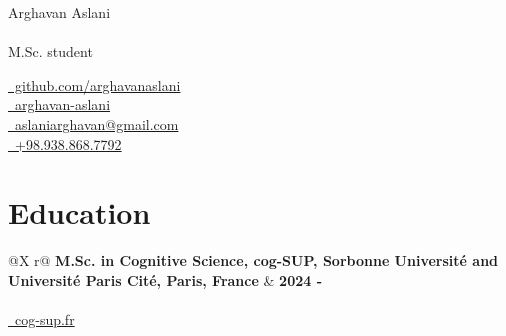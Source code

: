 \documentclass[a4paper,10pt]{article}
\begin{document}
\pagestyle{empty} 


\begin{minipage}[c]{2.5cm}
\end{minipage}%
\hspace{0em} %
\begin{minipage}[c]{\dimexpr\linewidth-2.5cm-15em\relax}
    \Huge{Arghavan Aslani}\\
    \vspace{0.1cm}\\
    \normalsize{M.Sc. student}
\end{minipage}%
\begin{minipage}[c]{0.3\linewidth}
    \href{https://github.com/arghavanaslani}{\raisebox{-0.05\height}\faGithub\ github.com/arghavanaslani} \\ 
    \href{https://www.linkedin.com/in/arghavan-aslani/}{\raisebox{-0.05\height}\faLinkedin\ arghavan-aslani} \\ 
    \href{mailto:aslaniarghavan@gmail.com}{\raisebox{-0.05\height}\faEnvelope \ aslaniarghavan@gmail.com} \\ 
    \href{tel:+989388687792}{\raisebox{-0.05\height}\faMobile \ +98.938.868.7792}
\end{minipage}

\section{Education}

\begin{tabularx}{\linewidth}{@{}X r@{}}
    \textbf{M.Sc. in Cognitive Science, cog-SUP, Sorbonne Université and Université Paris Cité, Paris, France} & \textbf{2024 -} \\
     \\
    \href{https://cog-sup.fr/}{\raisebox{-0.05\height}\faGlobe\ cog-sup.fr} \\
\end{tabularx}
\end{document}
